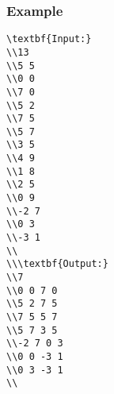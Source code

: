 \subsubsection{   Example  }
\begin{verbatim}
\textbf{Input:}
\\13
\\5 5
\\0 0
\\7 0
\\5 2
\\7 5
\\5 7
\\3 5
\\4 9
\\1 8
\\2 5
\\0 9
\\-2 7
\\0 3
\\-3 1
\\
\\\textbf{Output:}
\\7
\\0 0 7 0
\\5 2 7 5
\\7 5 5 7
\\5 7 3 5
\\-2 7 0 3
\\0 0 -3 1
\\0 3 -3 1
\\\end{verbatim}